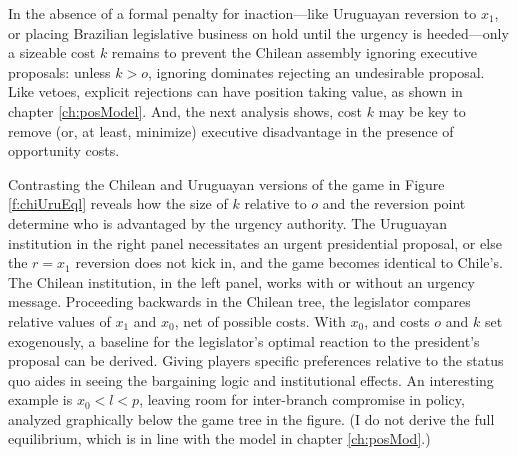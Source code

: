 
In the absence of a formal penalty for inaction---like Uruguayan reversion to $x_1$, or placing Brazilian legislative business on hold until the urgency is heeded---only a sizeable cost $k$ remains to prevent the Chilean assembly ignoring executive proposals: unless $k>o$, ignoring dominates rejecting an undesirable proposal. Like vetoes, explicit rejections can have position taking value, as shown in chapter \ref{ch:posModel}. And, the next analysis shows, cost $k$ may be key to remove (or, at least, minimize) executive disadvantage in the presence of opportunity costs. 

Contrasting the Chilean and Uruguayan versions of the game in Figure \ref{f:chiUruEql} reveals how the size of $k$ relative to $o$ and the reversion point determine who is advantaged by the urgency authority. The Uruguayan institution in the right panel necessitates an urgent presidential proposal, or else the $r=x_1$ reversion does not kick in, and the game becomes identical to Chile's. The Chilean institution, in the left panel, works with or without an urgency message. Proceeding backwards in the Chilean tree, the legislator compares relative values of $x_1$ and $x_0$, net of possible costs. With $x_0$, and costs $o$ and $k$ set exogenously, a baseline for the legislator's optimal reaction to the president's proposal can be derived. Giving players specific preferences relative to the status quo aides in seeing the bargaining logic and institutional effects. An interesting example is $x_0 < l < p$, leaving room for inter-branch compromise in policy, analyzed graphically below the game tree in the figure. (I do not derive the full equilibrium, which is in line with the model in chapter \ref{ch:posMod}.) 





